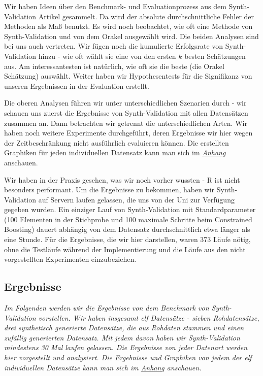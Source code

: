 \documentclass[12pt,a4paper,twoside]{scrartcl}
\numberwithin{equation}{section}
\begin{document}
\noindent
Wir haben Ideen über den Benchmark- und Evaluationprozess aus dem Synth-Validation Artikel \cite{schuler2017synth} gesammelt. Da wird der absolute durchschnittliche Fehler der Methoden als Maß benutzt. Es wird noch beobachtet, wie oft eine Methode von Synth-Validation und von dem Orakel ausgewählt wird. Die beiden Analysen sind bei uns auch vertreten. Wir fügen noch die kumulierte Erfolgsrate von Synth-Validation hinzu - wie oft wählt sie eine von den ersten $k$ besten Schätzungen aus. Am interessantesten ist natürlich, wie oft sie die beste (die Orakel Schätzung) auswählt. Weiter haben wir Hypothesentests für die Signifikanz von unseren Ergebnissen in der Evaluation erstellt. \par  

\noindent
Die oberen Analysen führen wir unter unterschiedlichen Szenarien durch - wir schauen uns zuerst die Ergebnisse von Synth-Validation mit allen Datensätzen zusammen an. Dann betrachten wir getrennt die unterschiedlichen Arten. Wir haben noch weitere Experimente durchgeführt, deren Ergebnisse wir hier wegen der Zeitbeschränkung nicht ausführlich evaluieren können. Die erstellten Graphiken für jeden individuellen Datensatz kann man sich im \emph{\hyperref[anhang]{Anhang}} anschauen. \par

\noindent
Wir haben in der Praxis gesehen, was wir noch vorher wussten - R ist nicht besonders performant. Um die Ergebnisse zu bekommen, haben wir Synth-Validation auf Servern laufen gelassen, die uns von der Uni zur Verfügung gegeben wurden. Ein einziger Lauf von Synth-Validation mit Standardparameter (100 Elementen in der Stichprobe und 100 maximale Schritte beim Constrained Boosting) dauert abhängig von dem Datensatz durchschnittlich etwa länger als eine Stunde. Für die Ergebnisse, die wir hier darstellen, waren 373 Läufe nötig, ohne die Testläufe während der Implementierung und die Läufe aus den nicht vorgestellten Experimenten einzubeziehen. \par  

\subsection{Ergebnisse}\label{subsec:ergebnisse} 
\noindent
\emph{Im Folgenden werden wir die Ergebnisse von dem Benchmark von Synth-Validation vorstellen. Wir haben insgesamt elf Datensätze - sieben Rohdatensätze, drei synthetisch generierte Datensätze, die aus Rohdaten stammen und einen zufällig generierten Datensatz. Mit jedem davon haben wir Synth-Validation mindestens 30 Mal laufen gelassen. Die Ergebnisse von jeder Datenart werden hier vorgestellt und analysiert. Die Ergebnisse und Graphiken von jedem der elf individuellen Datensätze kann man sich im \emph{\hyperref[anhang]{Anhang}} anschauen.}\par
\end{document}
